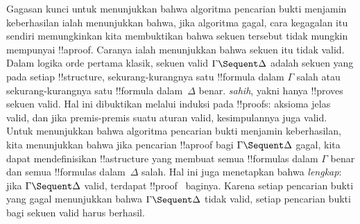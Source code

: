 \documentclass[../../../include/open-logic-section]{subfiles}
\begin{document}
Gagasan kunci untuk menunjukkan bahwa algoritma pencarian bukti menjamin
keberhasilan ialah menunjukkan bahwa, jika algoritma gagal, cara kegagalan
itu sendiri memungkinkan kita membuktikan bahwa sekuen tersebut tidak
mungkin mempunyai !!a{proof}. Caranya ialah menunjukkan bahwa sekuen itu
tidak valid. Dalam logika orde pertama klasik, sekuen valid
$\Gamma \Sequent \Delta$ adalah sekuen yang pada setiap !!{structure},
sekurang-kurangnya satu !!{formula} dalam $\Gamma$ salah atau
sekurang-kurangnya satu !!{formula} dalam~$\Delta$ benar. 
\emph{sahih}, yakni hanya !!{prove}s sekuen valid. Hal ini dibuktikan melalui
induksi pada !!{proof}s: aksioma jelas valid, dan jika premis-premis suatu
aturan valid, kesimpulannya juga valid. Untuk menunjukkan bahwa algoritma
pencarian bukti menjamin keberhasilan, kita menunjukkan bahwa jika pencarian
!!a{proof} bagi $\Gamma \Sequent \Delta$ gagal, kita dapat mendefinisikan
!!a{structure} yang membuat semua !!{formula}s dalam $\Gamma$ benar dan
semua !!{formula}s dalam~$\Delta$ salah. Hal ini juga menetapkan bahwa
 \emph{lengkap}: jika $\Gamma \Sequent \Delta$ valid, terdapat
!!{proof}~ baginya. Karena setiap pencarian bukti yang gagal
menunjukkan bahwa $\Gamma \Sequent \Delta$ tidak valid, setiap pencarian
bukti bagi sekuen valid harus berhasil.
\end{document}
